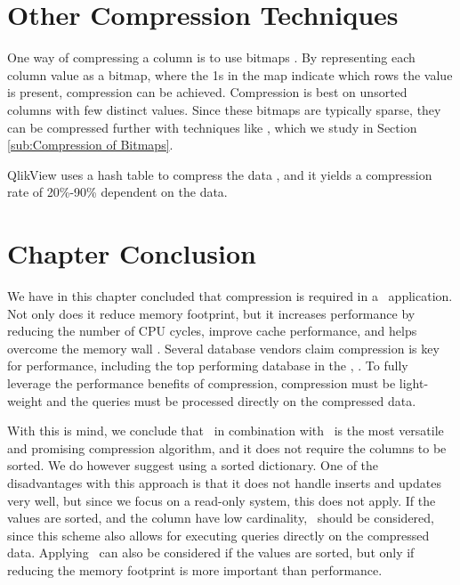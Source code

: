 

\section{Other Compression Techniques}
\label{sec:Other Compression Techniques}
One way of compressing a column is to use bitmaps \cite{Stonebraker2005-qz} . By representing each column value as a bitmap, where the 1s in the map indicate which rows the value is present, compression can be achieved. Compression is best on unsorted columns with few distinct values. Since these bitmaps are typically sparse, they can be compressed further with techniques like \rle, which we study in Section \ref{sub:Compression of Bitmaps}.

QlikView uses a hash table to compress the data \cite{Qlik2014-vd}, and it yields a compression rate of 20\%-90\% dependent on the data.

\section{Chapter Conclusion}
\label{sec:Chapter Conclusion}
We have in this chapter concluded that compression is required in a \bd~application. Not only does it reduce memory footprint, but it increases performance by reducing the number of CPU cycles, improve cache performance, and helps overcome the memory wall . Several database vendors claim compression is key for performance, including the top performing database in the \tpch, \exasol. To fully leverage the performance benefits of compression, compression must be light-weight and the queries must be processed directly on the compressed data. 

With this is mind, we conclude that \de~in combination with \bp~is the most versatile and promising compression algorithm, and it does not require the columns to be sorted. We do however suggest using a sorted dictionary. One of the disadvantages with this approach is that it does not handle inserts and updates very well, but since we focus on a read-only system, this does not apply. If the values are sorted, and the column have low cardinality, \rle~should be considered, since this scheme also allows for executing queries directly on the compressed data. Applying \dele~can also be considered if the values are sorted, but only if reducing the memory footprint is more important than performance.



